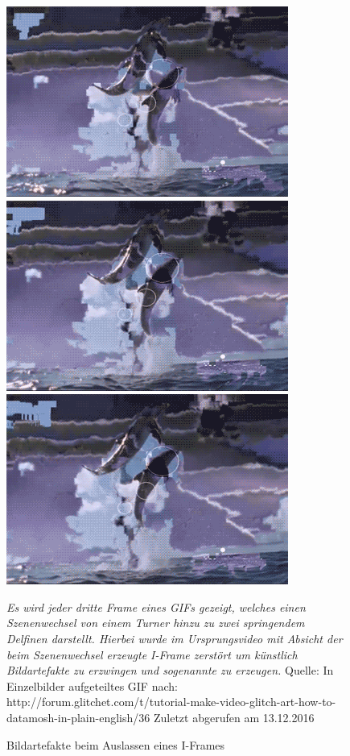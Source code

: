 \begin{figure}[h!]
        \includegraphics[scale=0.5]{images/corruptedGif/frame16.png}
            \includegraphics[scale=0.5]{images/corruptedGif/frame19.png}
                \includegraphics[scale=0.5]{images/corruptedGif/frame22.png}
    \caption{Bildartefakte beim Auslassen eines I-Frames}
    \textit{Es wird jeder dritte Frame eines GIFs gezeigt, welches einen Szenenwechsel von einem Turner hinzu zu zwei springendem Delfinen darstellt. Hierbei wurde im Ursprungsvideo mit Absicht der beim Szenenwechsel erzeugte I-Frame zerstört um künstlich Bildartefakte zu erzwingen und sogenannte  zu erzeugen.}
    \linebreak
    Quelle: In Einzelbilder aufgeteiltes GIF nach: http://forum.glitchet.com/t/tutorial-make-video-glitch-art-how-to-datamosh-in-plain-english/36
    \linebreak Zuletzt abgerufen am 13.12.2016
\end{figure}

